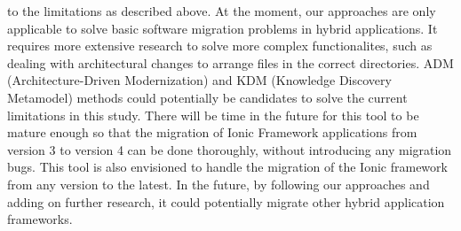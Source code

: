 \documentclass[conference]{IEEEtran}
\begin{document}
to the limitations as described above.
\newline \newline
At the moment, our approaches are only applicable to solve basic software migration problems in hybrid applications.
It requires more extensive research to solve more complex functionalites, such as dealing with
architectural changes to arrange files in the correct directories. ADM (Architecture-Driven Modernization) and
KDM (Knowledge Discovery Metamodel) methods \cite{b6} \cite{b10} could potentially be candidates to solve the
current limitations in this study.
\newline \newline
There will be time in the future for this tool to be mature enough so that the migration of Ionic Framework applications
from version  3 to version 4 can be done thoroughly, without introducing any migration bugs.
This tool is also envisioned to handle the migration of the Ionic framework from
any version to the latest. In the future, by following our approaches and adding on further research,
it could potentially migrate other hybrid application frameworks.
\end{document}
